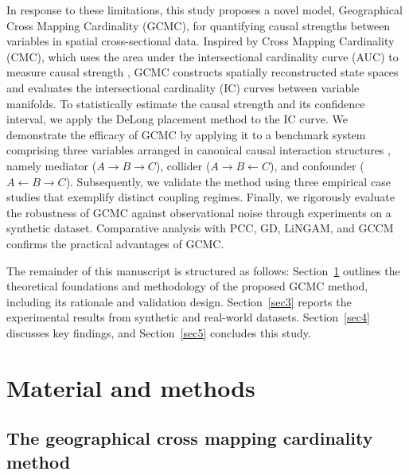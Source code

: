 \documentclass[authoryear,preprint,review,12pt]{elsarticle}
\begin{document}
In response to these limitations, this study proposes a novel model, Geographical Cross Mapping Cardinality (GCMC), for quantifying causal strengths between variables in spatial cross-sectional data. Inspired by Cross Mapping Cardinality (CMC), which uses the area under the intersectional cardinality curve (AUC) to measure causal strength \citep{tao2025cmc}, GCMC constructs spatially reconstructed state spaces and evaluates the intersectional cardinality (IC) curves between variable manifolds. To statistically estimate the causal strength and its confidence interval, we apply the DeLong placement method \citep{delong1988,sun2014delongfi} to the IC curve. We demonstrate the efficacy of GCMC by applying it to a benchmark system comprising three variables arranged in canonical causal interaction structures \citep{sanchez2024surd}, namely mediator (\(A \rightarrow B \rightarrow C\)), collider (\(A \rightarrow B \leftarrow C\)), and confounder (\(A \leftarrow B \rightarrow C\)). Subsequently, we validate the method using three empirical case studies that exemplify distinct coupling regimes. Finally, we rigorously evaluate the robustness of GCMC against observational noise through experiments on a synthetic dataset. Comparative analysis with PCC, GD, LiNGAM, and GCCM confirms the practical advantages of GCMC.

The remainder of this manuscript is structured as follows: Section~\ref{sec2} outlines the theoretical foundations and methodology of the proposed GCMC method, including its rationale and validation design. Section~\ref{sec3} reports the experimental results from synthetic and real-world datasets. Section~\ref{sec4} discusses key findings, and Section~\ref{sec5} concludes this study.

\section{Material and methods}\label{sec2} 

\subsection{The geographical cross mapping cardinality method}
\end{document}
